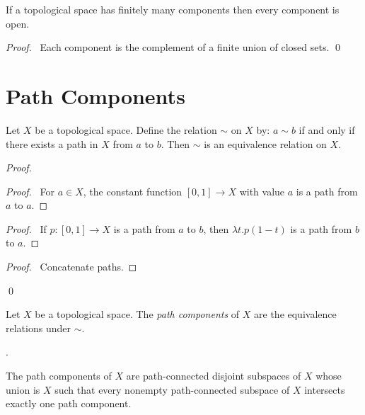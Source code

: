 \begin{proposition}
    If a topological space has finitely many components then every component is open.
\end{proposition}

\begin{proof}
    \pf\ Each component is the complement of a finite union of closed sets. \qed
\end{proof}

\section{Path Components}

\begin{proposition}
    Let $X$ be a topological space. Define the relation $\sim$ on $X$ by:
    $a \sim b$ if and only if there exists a path in $X$ from $a$ to $b$.
    Then $\sim$ is an equivalence relation on $X$.
\end{proposition}

\begin{proof}
    \pf
    \begin{proof}
        \pf\ For $a \in X$, the constant function $[0,1] \rightarrow X$
        with value $a$ is a path from $a$ to $a$.
    \end{proof}
    \begin{proof}
        \pf\ If $p : [0,1] \rightarrow X$ is a path from $a$ to $b$,
        then $\lambda t.p(1-t)$ is a path from $b$ to $a$.
    \end{proof}
    \begin{proof}
        \pf\ Concatenate paths.
    \end{proof}
    \qed
\end{proof}

\begin{definition}
    Let $X$ be a topological space. The \emph{path components} of $X$ are
    the equivalence relations under $\sim$.
\end{definition}.

\begin{theorem}
    \label{theorem:path_components}
    The path components of $X$ are path-connected disjoint subspaces of $X$
    whose union is $X$ such that every nonempty path-connected subspace of $X$
    intersects exactly one path component.
\end{theorem}

